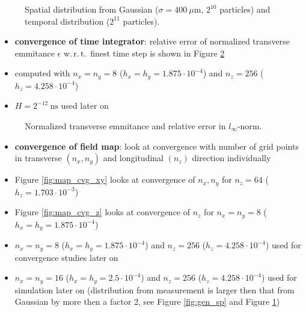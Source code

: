 \begin{center}
\begin{figure}[H]
   \begin{subfigure}{0.4\textwidth}
      
   \end{subfigure}
   \qquad \qquad \qquad
   \begin{subfigure}{0.4\textwidth}
      
   \end{subfigure}
   \caption{Spatial distribution from Gaussian ($\sigma=400\ \mu \mathrm{m}$, $2^{10}$ particles) and temporal distribution ($2^{11}$ particles).}
   \label{fig:gen_tmp}
\end{figure}
\end{center}

\newpage

\begin{itemize}
   \item \textbf{convergence of time integrator}: relative error of normalized transverse emmitance $\epsilon$ w.\,r.\,t.\ finest time step is shown in Figure \ref{fig:int_cvg}
   \item computed with $n_x=n_y=8$ ($h_x=h_y=1.875 \cdot 10^{-4}$) and $n_z=256$ ($h_z=4.258 \cdot 10^{-4}$)
   \item $H=2^{-12}\ \mathrm{ns}$ used later on
\end{itemize}

\begin{center}
\begin{figure}[H]
   \begin{subfigure}{0.4\textwidth}
      
   \end{subfigure}
   \qquad \qquad \qquad
   \begin{subfigure}{0.4\textwidth}
      
   \end{subfigure}
   \caption{Normalized transverse emmitance and relative error in $l_\infty$-norm.}
   \label{fig:int_cvg}
\end{figure}
\end{center}

\newpage

\begin{itemize}
   \item \textbf{convergence of field map}: look at convergence with number of grid points in transverse $(n_x, n_y)$ and longitudinal $(n_z)$ direction individually
   \item Figure \ref{fig:map_cvg_xy} looks at convergence of $n_x, n_y$ for $n_z=64$ ($h_z=1.703 \cdot 10^{-3}$)
   \item Figure \ref{fig:map_cvg_z} looks at convergence of $n_z$ for $n_x=n_y=8$ ($h_x=h_y=1.875 \cdot 10^{-4}$)
   \item $n_x=n_y=8$ ($h_x=h_y=1.875 \cdot 10^{-4}$) and $n_z=256$ ($h_z=4.258 \cdot 10^{-4}$) used for convergence studies later on
   \item $n_x=n_y=16$ ($h_x=h_y=2.5 \cdot 10^{-4}$) and $n_z=256$ ($h_z=4.258 \cdot 10^{-4}$) used for simulation later on (distribution from measurement is larger then that from Gaussian by more then a factor 2, see Figure \ref{fig:gen_sp} and Figure \ref{fig:gen_tmp})
\end{itemize}

